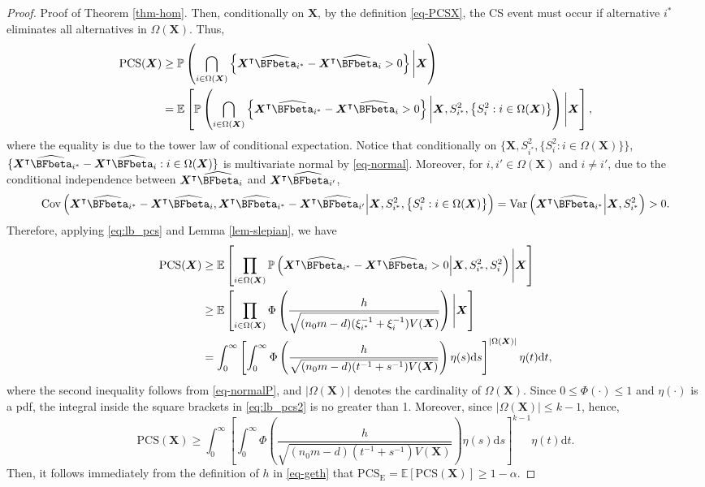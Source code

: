 \documentclass[ijoc,nonblindrev]{informs3}
\def\E{\mathbb{E}}
\def\Var{{\rm Var}}
\def\Cov{{\rm Cov}}
\def\pr{\mathbb{P}}
\def\ud{\mathrm{d}}
\def\bX{{\bm X}}
\def\PCS{\mathrm{PCS}}
\def\PCSE{\mathrm{PCS}_{\mathrm{E}}}
\begin{document}
\begin{proof}{Proof of Theorem \ref{thm-hom}.}
Then, conditionally on $\bX$, by the definition \eqref{eq-PCSX}, the CS event must occur if alternative $i^*$ eliminates all alternatives in $\Omega(\bX)$.
Thus,
\begin{align}\label{eq:lb_pcs}
\mathrm{PCS}(\bX) &\geq \pr \left( \bigcap_{i \in \Omega(\bX)} \left\{ \bX^\intercal \widehat{\BFbeta}_{i^*} - \bX^\intercal \widehat{\BFbeta}_i  > 0 \right\} \bigg| \bX \right) \nonumber \\
&= \E \left[ \pr \left( \bigcap_{i \in \Omega(\bX)} \left\{ \bX^\intercal \widehat{\BFbeta}_{i^*} - \bX^\intercal \widehat{\BFbeta}_i  > 0 \right\} \bigg| \bX, S_{i^*}^2, \left\{S_i^2: i \in \Omega(\bX) \right\} \right) \Bigg| \bX \right],
\end{align}
where the equality is due to the tower law of conditional expectation.
Notice that  conditionally on $\{\bX, S_{i^*}^2, \{S_i^2: i\in\Omega(\bX) \} \}$, $\{\bX^\intercal \widehat{\BFbeta}_{i^*} - \bX^\intercal \widehat{\BFbeta}_i: i\in\Omega(\bX)\}$ is multivariate normal by \eqref{eq-normal}.
Moreover, for $i,i' \in \Omega(\bX)$ and $i\neq i'$, due to the conditional independence between $\bX^\intercal \widehat{\BFbeta}_i$  and  $\bX^\intercal \widehat{\BFbeta}_{i'}$,
\[\Cov\left(\bX^\intercal \widehat{\BFbeta}_{i^*} - \bX^\intercal \widehat{\BFbeta}_i, \bX^\intercal \widehat{\BFbeta}_{i^*} - \bX^\intercal \widehat{\BFbeta}_{i'} \Big| \bX, S_{i^*}^2, \left\{ S_i^2: i\in\Omega(\bX) \right\}\right)= \Var\left(\bX^\intercal \widehat{\BFbeta}_{i^*} \Big| \bX, S_{i^*}^2\right)>0.\]
Therefore, applying  \eqref{eq:lb_pcs} and Lemma \ref{lem-slepian}, we have
\begin{align}
\mathrm{PCS}(\bX) &\geq \E \left[ \prod_{i\in\Omega(\bX)} \pr \left( \bX^\intercal \widehat{\BFbeta}_{i^*} - \bX^\intercal \widehat{\BFbeta}_i  > 0 \Big| \bX, S_{i^*}^2, S_i^2\right)  \Bigg| \bX \right]  \nonumber\\
&\geq \E \left[ \prod_{i\in\Omega(\bX)} \Phi\left( \frac{h}{\sqrt{(n_0m-d)(\xi_{i^*}^{-1} + \xi_i^{-1})V(\bX)}}  \right)\Bigg| \bX \right] \nonumber \\
&= \int_0^\infty \left[\int_0^\infty  \Phi\left( \frac{h}{\sqrt{(n_0m-d)(t^{-1} + s^{-1})V(\bX)}}  \right) \eta(s)\ud s \right]^{|\Omega(\bX)|} \eta(t) \ud t,
\label{eq:lb_pcs2}
\end{align}
where the second inequality follows from \eqref{eq-normalP}, and $|\Omega(\bX)|$ denotes the cardinality of $\Omega(\bX)$.
Since $0\leq  \Phi(\cdot) \leq 1$ and $\eta(\cdot)$ is a pdf, the integral inside the square brackets in \eqref{eq:lb_pcs2} is no greater than 1.
Moreover, since $|\Omega(\bX)|\leq k-1$, hence,
\[\mathrm{PCS}(\bX) \geq  \int_0^\infty \left[\int_0^\infty\Phi\left( \frac{h}{\sqrt{(n_0m-d)(t^{-1} + s^{-1})V(\bX)}}  \right) \eta(s)\ud s \right]^{k-1} \eta(t) \ud t. \]
Then, it follows immediately from the definition of $h$ in \eqref{eq-geth} that $\PCSE=\E[\PCS(\bX)]\ge 1-\alpha$.
\Halmos
\end{proof}
\end{document}
